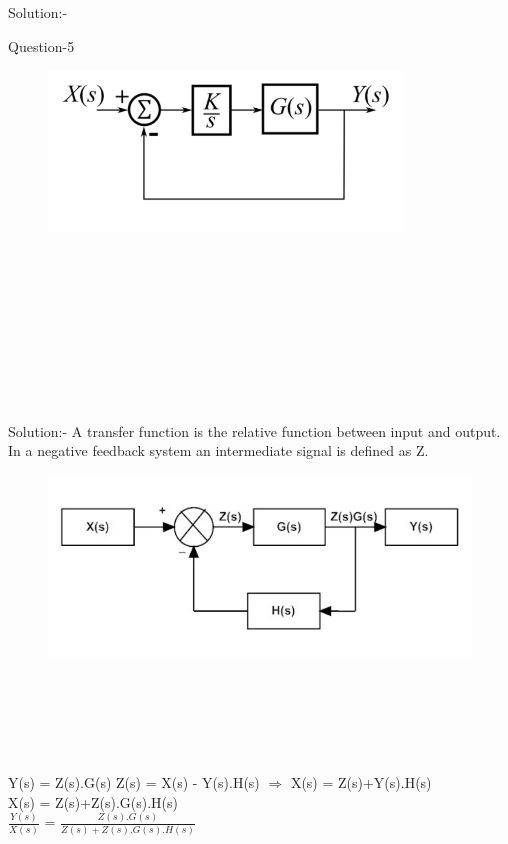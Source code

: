 \documentclass[journal,12pt,twocolumn]{IEEEtran}
\begin{document}
\begin{frame}{Solution:- }
\begin{frame}{Question-5 }
\begin{figure}[h]
     \includegraphics[width=\linewidth]{./figs/gate.png}
    \end{figure}
\end{frame}
\\\\\\\\\\\\\\\\
\begin{frame}{Solution:- }
A transfer function is the relative function between input and output.
\newline In a negative feedback system an intermediate signal is defined as Z.
\begin{figure}
    \centering
    \includegraphics[width =\linewidth]{./figs/feedback.png}
\end{figure}
\end{frame}
\begin{frame}
\\\\\\\\\\
Y(s) = Z(s).G(s)
\newline 
Z(s) = X(s) - Y(s).H(s) $\Rightarrow$ X(s) = Z(s)+Y(s).H(s)
\newline \\
X(s) = Z(s)+Z(s).G(s).H(s)
\newline \\
$\frac{Y(s)}{X(s)}$ = $\frac{Z(s).G(s)}{Z(s)+Z(s).G(s).H(s)}$


\end{frame}
\end{frame}
\end{document}

